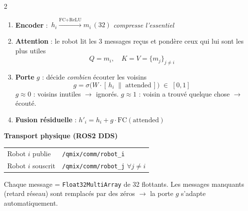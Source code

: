 \documentclass[a4paper,landscape]{article}
\begin{document}
\begin{multicols}{2}
\begin{tcolorbox}[colback=colTrainer!6,colframe=colTrainer,
    fonttitle=\bfseries\normalsize,
    title=Partie 3 — Contribution 2 : GeoCommQMIX (Communication),
    arc=5pt,boxrule=1.3pt]
\begin{enumerate}[leftmargin=1.5em,itemsep=3pt]
    \item \textbf{Encoder} : \(\,h_i \xrightarrow{\text{FC}+\text{ReLU}} m_i\,(32)\)
          \quad \textit{compresse l'essentiel}
    \item \textbf{Attention} : le robot lit les 3 messages reçus et pondère
          ceux qui lui sont les plus utiles
          \[
              Q = m_i,\quad K = V = \{m_j\}_{j \neq i}
          \]
    \item \textbf{Porte} \(g\) : décide \textit{combien} écouter les voisins
          \[
              g = \sigma\!\bigl(W \cdot [\,h_i \;\|\; \text{attended}\,]\bigr)
              \;\in\; [0,1]
          \]
          \(g \approx 0\) : voisins inutiles \(\to\) ignorés.
          \(g \approx 1\) : voisin a trouvé quelque chose \(\to\) écouté.
    \item \textbf{Fusion résiduelle} :
          \(h'_i = h_i + g \cdot \text{FC}(\text{attended})\)
\end{enumerate}

\medskip
\textbf{Transport physique (ROS2 DDS)}

\begin{center}\small
\begin{tabular}{@{}ll@{}}
\toprule
Robot \(i\) publie & \texttt{/qmix/comm/robot\_i} \\
Robot \(i\) souscrit & \texttt{/qmix/comm/robot\_j} \quad \(\forall j \neq i\) \\
\bottomrule
\end{tabular}
\end{center}

Chaque message = \texttt{Float32MultiArray} de 32 flottants.
Les messages manquants (retard réseau) sont remplacés par des zéros
\(\to\) la porte \(g\) s'adapte automatiquement.

\end{tcolorbox}

\end{multicols}
\end{document}
